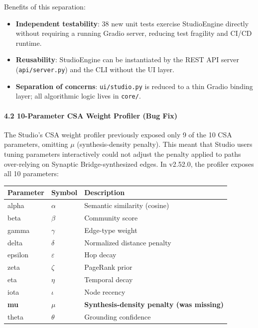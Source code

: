 Benefits of this separation:
\begin{itemize}
\item \textbf{Independent testability}: 38 new unit tests exercise StudioEngine directly without requiring a running Gradio server, reducing test fragility and CI/CD runtime.
\item \textbf{Reusability}: StudioEngine can be insta\-ntiated by the REST API server (\texttt{api/server.py}) and the CLI without the UI layer.
\item \textbf{Separation of concerns}: \texttt{ui/studio.py} is reduced to a thin Gradio binding layer; all algorithmic logic lives in \texttt{core/}.

\end{itemize}
\paragraph{4.2 10-Parameter CSA Weight Profiler (Bug Fix)}
The Studio's CSA weight profiler previously exposed only 9 of the 10 CSA parameters, omitting $\mu$ (synthesis-density penalty). This meant that Studio users tuning parameters inter\-actively could not adjust the penalty applied to paths over-relying on Synaptic Bridge-synthesized edges. In v2.52.0, the profiler exposes all 10 parameters:

\begin{center}
{\footnotesize
\begin{tabularx}{\columnwidth}{|>{\raggedright\arraybackslash}X|>{\raggedright\arraybackslash}X|>{\raggedright\arraybackslash}X|}
\hline
Parameter & Symbol & Description \\ \hline
alpha & $\alpha$ & Semantic similarity (cosine) \\ \hline
beta & $\beta$ & Community score \\ \hline
gamma & $\gamma$ & Edge-type weight \\ \hline
delta & $\delta$ & Normalized distance penalty \\ \hline
epsilon & $\varepsilon$ & Hop decay \\ \hline
zeta & $\zeta$ & PageRank prior \\ \hline
eta & $\eta$ & Temporal decay \\ \hline
iota & $\iota$ & Node recency \\ \hline
\textbf{mu} & \textbf{$\mu$} & \textbf{Synthesis-density penalty (was missing)} \\ \hline
theta & $\theta$ & Grounding confidence \\ \hline
\end{tabularx}
}
\end{center}

